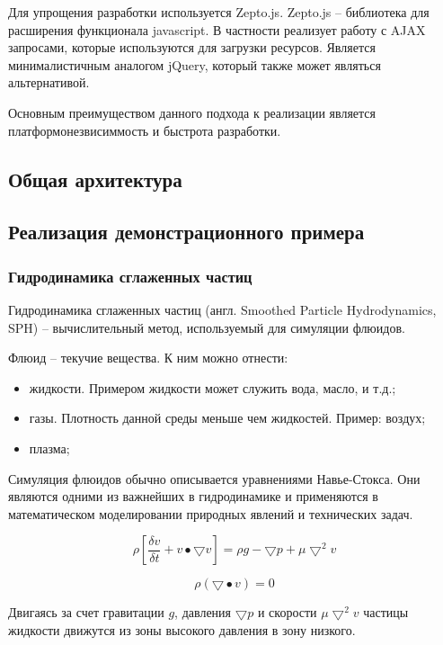 Для упрощения разработки используется Zepto.js. Zepto.js -- библиотека для расширения функционала 
javascript. В частности реализует работу с AJAX запросами, которые используются для загрузки 
ресурсов. Является минималистичным аналогом jQuery, который также может являться альтернативой.

Основным преимуществом данного подхода к реализации является платформонезвисиммость и быстрота 
разработки.

\subsection{Общая архитектура}
\subsection{Реализация демонстрационного примера}
\subsubsection{Гидродинамика сглаженных частиц}

Гидродинамика сглаженных частиц (англ. Smoothed Particle Hydrodynamics, SPH) -- вычислительный 
метод, используемый для симуляции флюидов.

Флюид -- текучие вещества. К ним можно отнести:
\begin{itemize}
  \item жидкости. Примером жидкости может служить вода, масло, и т.д.;
  \item газы. Плотность данной среды меньше чем жидкостей. Пример: воздух;
  \item плазма;
\end{itemize}

Симуляция флюидов обычно описывается уравнениями Навье-Стокса.
Они являются одними из важнейших в гидродинамике и применяются в математическом
моделировании природных явлений и технических задач.

\begin{equation}
\label{eq:nve1}
  \rho[\frac{\delta{}v}{\delta{}t} + v \bullet \bigtriangledown{}v] = \rho{}g - \bigtriangledown{}p + \mu{}\bigtriangledown^2v
\end{equation}

\begin{equation}
\label{eq:massCont}
  \rho(\bigtriangledown\bullet{}v) = 0
\end{equation}

Двигаясь за счет гравитации $g$, давления $\bigtriangledown{}p$ и скорости $\mu\bigtriangledown^2v$ частицы жидкости движутся из зоны высокого давления в зону низкого.

